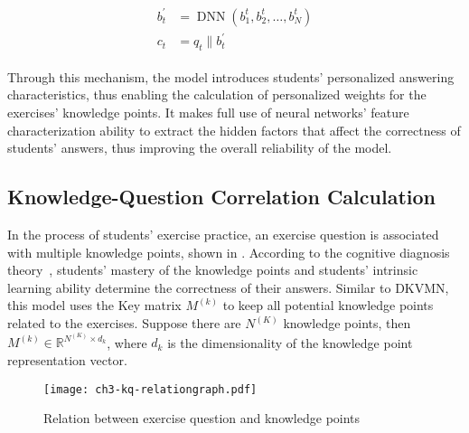 \begin{align}\label{fml:ch3-sbcap}
    \begin{split}
        b^{\prime}_t &= \operatorname{DNN}(b_1^t,b_2^t,\ldots,b_N^t) \\
        c_t &= q_t\|b^{\prime}_t
    \end{split}
\end{align}

Through this mechanism, the model introduces students' personalized answering characteristics, thus enabling the calculation of personalized weights for the exercises' knowledge points. It makes full use of neural networks' feature characterization ability to extract the hidden factors that affect the correctness of students' answers, thus improving the overall reliability of the model.

\subsection{Knowledge-Question Correlation Calculation}

In the process of students' exercise practice, an exercise question is associated with multiple knowledge points, shown in \figname{\ref{fig:ch3-kq-relationgraph}}. According to the cognitive diagnosis theory~\cite{chiu2018cognitive}, students' mastery of the knowledge points and students' intrinsic learning ability determine the correctness of their answers. Similar to DKVMN, this model uses the Key matrix \(M^{(k)}\) to keep all potential knowledge points related to the exercises. Suppose there are \(N^{(K)}\) knowledge points, then \(M^{(k)}\in\mathbb{R}^{{N^{(K)}}\times d_k}\), where \(d_k\) is the dimensionality of the knowledge point representation vector.

\begin{figure}[htbp!]
    \centering
    \texttt{[image: ch3-kq-relationgraph.pdf]}
    \caption{Relation between exercise question and knowledge points}\label{fig:ch3-kq-relationgraph}
\end{figure}

